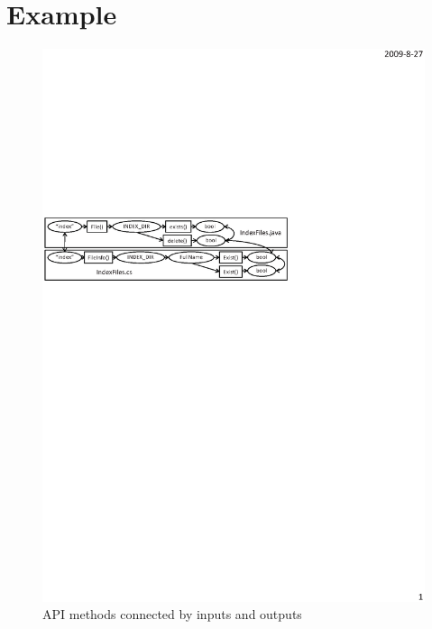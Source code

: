 \section{Example}
\label{sec:example}

\begin{figure}[t]
\centering
\includegraphics[scale=0.8,clip]{figure/dataflow.eps}\vspace*{-3ex}
 \caption
{\label{fig:dataflow}API methods connected by inputs and
outputs}\vspace*{-3ex}
\end{figure}





